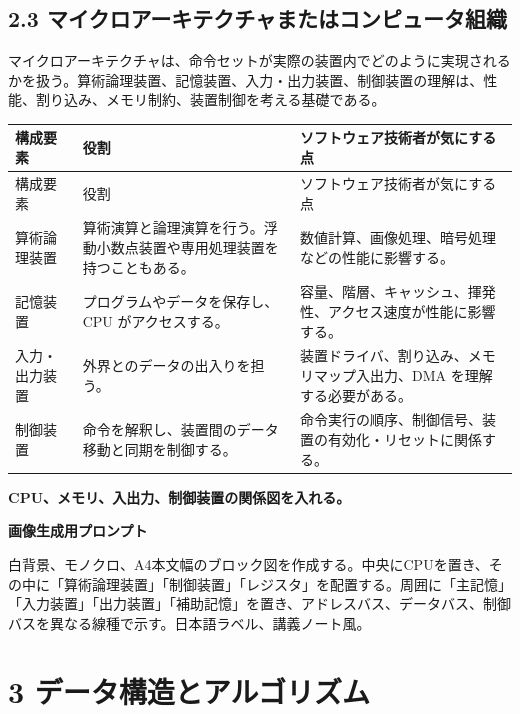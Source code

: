 \documentclass[a4paper,11pt]{ltjsarticle}
\begin{document}
\subsection{2.3 マイクロアーキテクチャまたはコンピュータ組織}

マイクロアーキテクチャは、命令セットが実際の装置内でどのように実現されるかを扱う。算術論理装置、記憶装置、入力・出力装置、制御装置の理解は、性能、割り込み、メモリ制約、装置制御を考える基礎である。

\begin{longtable}{>{\raggedright\arraybackslash}p{}>{\raggedright\arraybackslash}p{}>{\raggedright\arraybackslash}p{}}
\toprule
構成要素 & 役割 & ソフトウェア技術者が気にする点 \\
\midrule
\endfirsthead
\toprule
構成要素 & 役割 & ソフトウェア技術者が気にする点 \\
\midrule
\endhead
算術論理装置 & 算術演算と論理演算を行う。浮動小数点装置や専用処理装置を持つこともある。 & 数値計算、画像処理、暗号処理などの性能に影響する。 \\
記憶装置 & プログラムやデータを保存し、CPU がアクセスする。 & 容量、階層、キャッシュ、揮発性、アクセス速度が性能に影響する。 \\
入力・出力装置 & 外界とのデータの出入りを担う。 & 装置ドライバ、割り込み、メモリマップ入出力、DMA を理解する必要がある。 \\
制御装置 & 命令を解釈し、装置間のデータ移動と同期を制御する。 & 命令実行の順序、制御信号、装置の有効化・リセットに関係する。 \\
\bottomrule
\end{longtable}

\begin{todobox}
\textbf{CPU、メモリ、入出力、制御装置の関係図を入れる。}\par
\textbf{画像生成用プロンプト}\par
白背景、モノクロ、A4本文幅のブロック図を作成する。中央にCPUを置き、その中に「算術論理装置」「制御装置」「レジスタ」を配置する。周囲に「主記憶」「入力装置」「出力装置」「補助記憶」を置き、アドレスバス、データバス、制御バスを異なる線種で示す。日本語ラベル、講義ノート風。

\end{todobox}

\section{3 データ構造とアルゴリズム}
\end{document}
